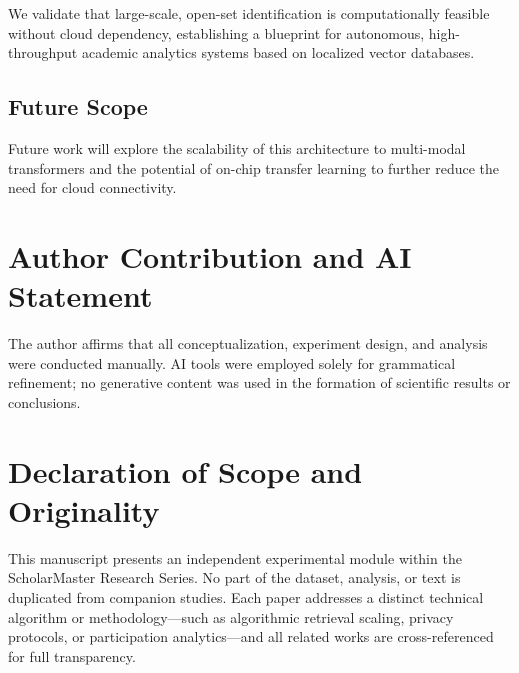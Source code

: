 \documentclass[conference]{IEEEtran}
\begin{document}
We validate that large-scale, open-set identification is computationally feasible without cloud dependency, establishing a blueprint for autonomous, high-throughput academic analytics systems based on localized vector databases.

\subsection{Future Scope}
Future work will explore the scalability of this architecture to multi-modal transformers and the potential of on-chip transfer learning to further reduce the need for cloud connectivity.

\section*{Author Contribution and AI Statement}
The author affirms that all conceptualization, experiment design, and analysis were conducted manually. AI tools were employed solely for grammatical refinement; no generative content was used in the formation of scientific results or conclusions.

\section*{Declaration of Scope and Originality}
This manuscript presents an independent experimental module within the ScholarMaster Research Series. 
No part of the dataset, analysis, or text is duplicated from companion studies. 
Each paper addresses a distinct technical algorithm or methodology—such as algorithmic retrieval scaling, privacy protocols, or participation analytics—and all related works are cross-referenced for full transparency.
\end{document}
